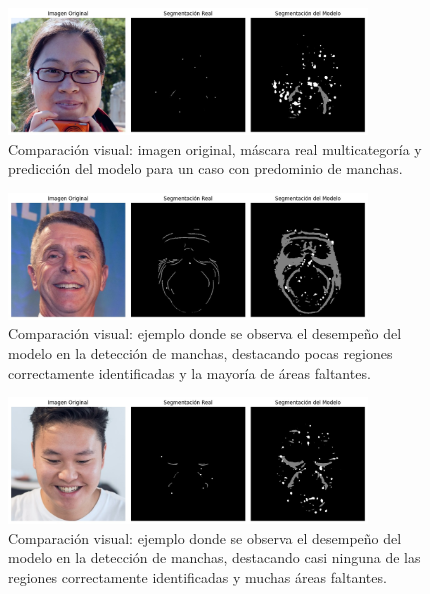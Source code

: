 \begin{enumerate}
\begin{itemize}
  \begin{figure}[H]
  \centering
  \includegraphics[width=0.85\textwidth]{4/figures/unetvit1.jpg}
  \caption{Comparación visual: imagen original, máscara real multicategoría y predicción del modelo para un caso con predominio de manchas.}
  \label{fig:validacionunetvit1}
  \end{figure}
  
  \begin{figure}[H]
  \centering
  \includegraphics[width=0.85\textwidth]{4/figures/unetvit2.jpg}
  \caption{Comparación visual: ejemplo donde se observa el desempeño del modelo en la detección de manchas, destacando pocas regiones correctamente identificadas y la mayoría de áreas faltantes.}
  \label{fig:validacionunetvit2}
  \end{figure}
  
  \begin{figure}[H]
    \centering
    \includegraphics[width=0.85\textwidth]{4/figures/unetvit3.jpg}
    \caption{Comparación visual: ejemplo donde se observa el desempeño del modelo en la detección de manchas, destacando casi ninguna de las regiones correctamente identificadas y muchas áreas faltantes.}
    \label{fig:validacionunetvit3}
    \end{figure}


\end{itemize}
\end{enumerate}
